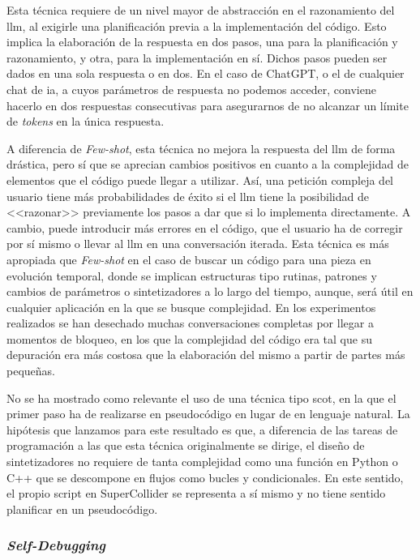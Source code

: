 Esta técnica requiere de un nivel mayor de abstracción en el razonamiento del \gls{llm}, al exigirle una planificación previa a la implementación del código. Esto implica la elaboración de la respuesta en dos pasos, una para la planificación y razonamiento, y otra, para la implementación en sí. Dichos pasos pueden ser dados en una sola respuesta o en dos. En el caso de ChatGPT, o el de cualquier chat de \gls{ia}, a cuyos parámetros de respuesta no podemos acceder, conviene hacerlo en dos respuestas consecutivas para asegurarnos de no alcanzar un límite de \textit{tokens} en la única respuesta. 

A diferencia de \textit{Few-shot}, esta técnica no mejora la respuesta del \gls{llm} de forma drástica, pero sí que se aprecian cambios positivos en cuanto a la complejidad de elementos que el código puede llegar a utilizar. Así, una petición compleja del usuario tiene más probabilidades de éxito si el \gls{llm} tiene la posibilidad de <<razonar>> previamente los pasos a dar que si lo implementa directamente. A cambio, puede introducir más errores en el código, que el usuario ha de corregir por sí mismo o llevar al \gls{llm} en una conversación iterada. Esta técnica es más apropiada que \textit{Few-shot} en el caso de buscar un código para una pieza en evolución temporal, donde se implican estructuras tipo rutinas, patrones y cambios de parámetros o sintetizadores a lo largo del tiempo, aunque, será útil en cualquier aplicación en la que se busque complejidad. En los experimentos realizados se han desechado muchas conversaciones completas por llegar a momentos de bloqueo, en los que la complejidad del código era tal que su depuración era más costosa que la elaboración del mismo a partir de partes más pequeñas.

No se ha mostrado como relevante el uso de una técnica tipo \gls{scot}, en la que el primer paso ha de realizarse en pseudocódigo en lugar de en lenguaje natural. La hipótesis que lanzamos para este resultado es que, a diferencia de las tareas de programación a las que esta técnica originalmente se dirige, el diseño de sintetizadores no requiere de tanta complejidad como una función en Python o C++ que se descompone en flujos como bucles y condicionales. En este sentido, el propio script en SuperCollider se representa a sí mismo y no tiene sentido planificar en un pseudocódigo.

\subsubsection{\textit{Self-Debugging}}

